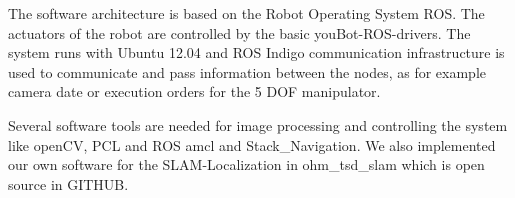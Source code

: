 The software architecture is based on the Robot Operating System ROS. The actuators of the robot are controlled by the basic youBot-ROS-drivers. The system runs with Ubuntu 12.04 and ROS Indigo communication infrastructure is used to communicate and pass information between the nodes, as for example camera date or execution orders for the 5 DOF manipulator. 

Several software tools are needed for image processing and controlling the system like openCV, PCL and ROS amcl and Stack\_Navigation.
We also implemented our own software for the SLAM-Localization in ohm\_tsd\_slam which is open source in GITHUB. 